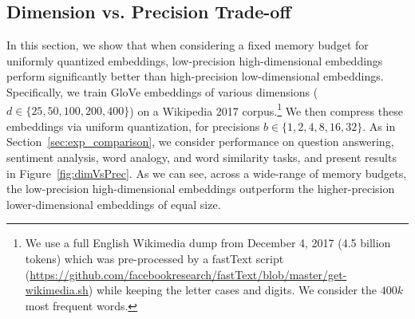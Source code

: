 
\subsection{Dimension vs. Precision Trade-off}
\label{sec:dim_vs_prec}
%
In this section, we show that when considering a fixed memory budget for uniformly quantized embeddings, low-precision high-dimensional embeddings perform significantly better than high-precision low-dimensional embeddings.
Specifically, we train GloVe embeddings of various dimensions ($d\in\{25,50,100,200,400\}$) on a Wikipedia 2017 corpus.\footnote{We use a full English Wikimedia dump from December 4, 2017 (4.5 billion tokens) which was pre-processed by a fastText script (\url{https://github.com/facebookresearch/fastText/blob/master/get-wikimedia.sh}) while keeping the letter cases and digits.
We consider the $400k$ most frequent words.}
We then compress these embeddings via uniform quantization, for precisions $b\in\{1,2,4,8,16,32\}$.
As in Section~\ref{sec:exp_comparison}, we consider performance on question answering, sentiment analysis, word analogy, and word similarity tasks, and present results in Figure~\ref{fig:dimVsPrec}.
As we can see, across a wide-range of memory budgets, the low-precision high-dimensional embeddings outperform the higher-precision lower-dimensional embeddings of equal size.
